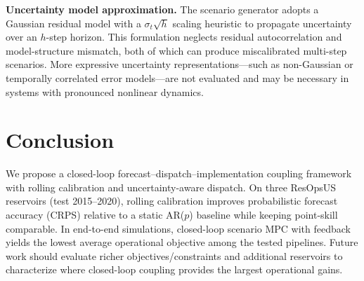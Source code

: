 \documentclass[conference]{IEEEtran}
\begin{document}
\textbf{Uncertainty model approximation.}
The scenario generator adopts a Gaussian residual model with a $\sigma_t \sqrt{h}$ scaling heuristic to propagate
uncertainty over an $h$-step horizon. This formulation neglects residual autocorrelation and model-structure mismatch,
both of which can produce miscalibrated multi-step scenarios. More expressive uncertainty representations---such as
non-Gaussian or temporally correlated error models---are not evaluated and may be necessary in systems with
pronounced nonlinear dynamics.

\section{Conclusion}
We propose a closed-loop forecast--dispatch--implementation coupling framework with rolling
calibration and uncertainty-aware dispatch. On three ResOpsUS reservoirs (test 2015--2020),
rolling calibration improves probabilistic forecast accuracy (CRPS) relative to a static
AR($p$) baseline while keeping point-skill comparable. In end-to-end simulations, closed-loop
scenario MPC with feedback yields the lowest average operational objective among the tested
pipelines. Future work should evaluate richer objectives/constraints and additional
reservoirs to characterize where closed-loop coupling provides the largest operational gains.

\label{ReferencesStart}


\end{document}

